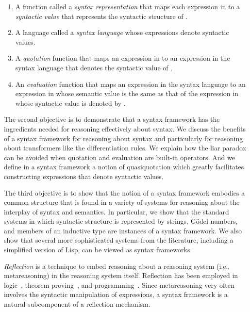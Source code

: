\documentclass[11pt,fleqn]{article}
\newcommand{\be}{\begin{enumerate}}
\newcommand{\ee}{\end{enumerate}}
\begin{document}
\be

  \item A function called a \emph{syntax representation} that maps
    each expression  in  to a \emph{syntactic value} that
    represents the syntactic structure of .

  \item A language called a \emph{syntax language} whose expressions
    denote syntactic values.  

  \item A \emph{quotation} function that maps an expression  in 
    to an expression in the syntax language that denotes the syntactic
    value of .

  \item An \emph{evaluation} function that maps an expression  in
    the syntax language to an expression in  whose semantic value
    is the same as that of the expression in  whose syntactic value
    is denoted by .

\ee

The second objective is to demonstrate that a syntax framework has the
ingredients needed for reasoning effectively about syntax.  We discuss
the benefits of a syntax framework for reasoning about syntax and
particularly for reasoning about transformers like the differentiation
rules.  We explain how the liar paradox can be avoided when quotation
and evaluation are built-in operators.  And we define in a syntax
framework a notion of quasiquotation which greatly facilitates
constructing expressions that denote syntactic values.

The third objective is to show that the notion of a syntax framework
embodies a common structure that is found in a variety of systems for
reasoning about the interplay of syntax and semantics.  In particular,
we show that the standard systems in which syntactic structure is
represented by strings, G\"odel numbers, and members of an inductive
type are instances of a syntax framework.  We also show that several
more sophisticated systems from the literature, including a simplified
version of Lisp, can be viewed as syntax frameworks.

\emph{Reflection} is a technique to embed reasoning about a reasoning
system (i.e., metareasoning) in the reasoning system itself.
Reflection has been employed in logic~\cite{Koellner09}, theorem
proving~\cite{Harrison95}, and programming~\cite{DemersMalenfant95}.
Since metareasoning very often involves the syntactic manipulation of
expressions, a syntax framework is a natural subcomponent of a
reflection mechanism.
\end{document}
